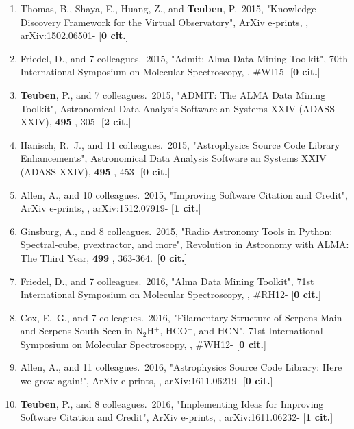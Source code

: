\documentclass[11pt,letterpaper]{article}
\begin{document}
\begin{enumerate}[resume,label=\textbf{\arabic*}.]
\item  
Thomas, B., Shaya, E., Huang, Z., and {\bf Teuben}, P.\  2015,  "Knowledge 
Discovery Framework for the Virtual Observatory", ArXiv e-prints,  , 
arXiv:1502.06501- [{\bf 0 cit.}] 


\item  
Friedel, D., and 7 colleagues.\  2015,  "Admit: Alma Data Mining Toolkit", 
70th International Symposium on Molecular Spectroscopy,  , \#WI15- [{\bf 0 
cit.}] 

\item  
{\bf Teuben}, P., and 7 colleagues.\  2015,  "ADMIT: The ALMA Data Mining 
Toolkit", Astronomical Data Analysis Software an Systems XXIV (ADASS XXIV),  
{\bf 495} , 305- [{\bf 2 cit.}] 

\item  
Hanisch, R.~J., and 11 colleagues.\  2015,  "Astrophysics Source Code 
Library Enhancements", Astronomical Data Analysis Software an Systems XXIV 
(ADASS XXIV),  {\bf 495} , 453- [{\bf 0 cit.}] 

\item  
Allen, A., and 10 colleagues.\  2015,  "Improving Software Citation and 
Credit", ArXiv e-prints,  , arXiv:1512.07919- [{\bf 1 cit.}] 

\item  
Ginsburg, A., and 8 colleagues.\  2015,  "Radio Astronomy Tools in Python: 
Spectral-cube, pvextractor, and more", Revolution in Astronomy with ALMA: 
The Third Year,  {\bf 499} , 363-364.\  [{\bf 0 cit.}] 


\item  
Friedel, D., and 7 colleagues.\  2016,  "Alma Data Mining Toolkit", 71st 
International Symposium on Molecular Spectroscopy,  , \#RH12- [{\bf 0 
cit.}] 

\item  
Cox, E.~G., and 7 colleagues.\  2016,  "Filamentary Structure of Serpens 
Main and Serpens South Seen in N$_{2}$H$^{+}$, HCO$^{+}$, and HCN", 71st 
International Symposium on Molecular Spectroscopy,  , \#WH12- [{\bf 0 
cit.}] 

\item  
Allen, A., and 11 colleagues.\  2016,  "Astrophysics Source Code Library: 
Here we grow again!", ArXiv e-prints,  , arXiv:1611.06219- [{\bf 0 cit.}] 

\item  
{\bf Teuben}, P., and 8 colleagues.\  2016,  "Implementing Ideas for Improving 
Software Citation and Credit", ArXiv e-prints,  , arXiv:1611.06232- [{\bf 1 
cit.}] 




\end{enumerate}
\end{document}
